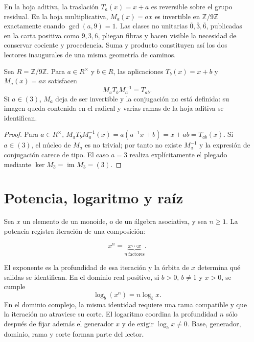 En la hoja aditiva, la traslación \(T_a(x)=x+a\) es reversible sobre el grupo
residual. En la hoja multiplicativa, \(M_a(x)=ax\) es invertible en
\(\mathbb Z/9\mathbb Z\) exactamente cuando \(\gcd(a,9)=1\). Las clases no
unitarias \(\overline0,\overline3,\overline6\), publicadas en la carta
positiva como \(9,3,6\), pliegan fibras y hacen visible la necesidad de
conservar cociente y procedencia. Suma y producto constituyen así los dos
lectores inaugurales de una misma geometría de caminos.

\begin{lemma}
\label{lem:conjugacion-afin-app-rev3}
Sea \(R=\mathbb Z/9\mathbb Z\). Para \(a\in R^\times\) y \(b\in R\), las
aplicaciones \(T_b(x)=x+b\) y \(M_a(x)=ax\) satisfacen
\begin{equation}
 M_aT_bM_a^{-1}=T_{ab}.
 \label{eq:conjugacion-afin-app-rev3}
\end{equation}
Si \(a\in(3)\), \(M_a\) deja de ser invertible y la conjugación no está
definida: su imagen queda contenida en el radical y varias ramas de la hoja
aditiva se identifican.
\end{lemma}

\begin{proof}
Para \(a\in R^\times\),
\(
 M_aT_bM_a^{-1}(x)=a(a^{-1}x+b)=x+ab=T_{ab}(x)
\).
Si \(a\in(3)\), el núcleo de \(M_a\) es no trivial; por tanto no existe
\(M_a^{-1}\) y la expresión de conjugación carece de tipo. El caso
\(a=3\) realiza explícitamente el plegado mediante
\(\ker M_3=\operatorname{im}M_3=(3)\).
\end{proof}

\section{Potencia, logaritmo y raíz}

Sea \(x\) un elemento de un monoide, o de un álgebra asociativa, y sea
\(n\geq1\). La potencia registra iteración de una composición:

\[
 x^n=\underbrace{x\cdots x}_{n\ \mathrm{factores}}.
\]

El exponente es la profundidad de esa iteración y la órbita de \(x\) determina
qué salidas se identifican. En el dominio real positivo, si \(b>0\),
\(b\neq1\) y \(x>0\), se cumple
\[
 \log_b(x^n)=n\log_b x.
\]
En el dominio complejo, la misma identidad requiere una rama compatible y
que la iteración no atraviese su corte. El logaritmo coordina la profundidad
\(n\) sólo después de fijar además el generador \(x\) y de exigir
\(\log_b x\neq0\). Base, generador, dominio, rama y corte forman parte del
lector.

